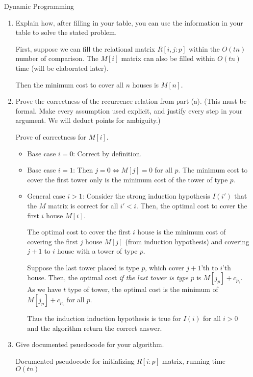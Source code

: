 \documentclass{article}
\numberwithin{table}{section}
\numberwithin{figure}{section}
\begin{document}
\begin{section}{Dynamic Programming}
\begin{enumerate}
    \item Explain how, after filling in your table, you can use the information in your table to solve the stated problem.
    \begin{tcolorbox}
        First, suppose we can fill the relational matrix $R[i, j : p]$ within the $O(tn)$ number of comparison. The $M[i]$ matrix can also be filled within $O(tn)$ time (will be elaborated later). 
        
        Then the minimum cost to cover all $n$ houses is $M[n]$.
    \end{tcolorbox}
    
    \item Prove the correctness of the recurrence relation from part (a). (This must be formal. Make every assumption used explicit, and justify every step in your argument. We will deduct points for ambiguity.)
    \begin{tcolorbox}
        Prove of correctness for $M[i]$.
        \begin{itemize}[noitemsep]
            \item Base case $i = 0$: Correct by definition. 
            \item Base case $i = 1$: Then $j = 0 \iff M[j] = 0$ for all $p$. The minimum cost to cover the first tower only is the minimum cost of the tower of type $p$. 
            \item General case $i > 1$: Consider the strong induction hypothesis $I(i')$ that the $M$ matrix is correct for all $i' < i$. Then, the optimal cost to cover the first $i$ house $M[i]$. 
            
            The optimal cost to cover the first $i$ house is the minimum cost of covering the first $j$ house $M[j]$ (from induction hypothesis) and covering $j+1$ to $i$ house with a tower of type $p$. 
            
            Suppose the last tower placed is type $p$, which cover $j+1$'th to $i$'th house. Then, the optimal cost \emph{if the last tower is type $p$} is $M[j_p] + c_{p_i}$. As we have $t$ type of tower, the optimal cost is the minimum of $M[j_p] + c_{p_i}$ for all $p$.
            
            Thus the induction induction hypothesis is true for $I(i)$ for all $i > 0$ and the algorithm return the correct answer.
        \end{itemize}
    \end{tcolorbox}
    
    \newpage
    \item Give documented psuedocode for your algorithm.
    \begin{tcolorbox}[breakable]
        Documented pseudocode for initializing $R[i : p]$ matrix, running time $O(tn)$
        

\end{tcolorbox}
\end{enumerate}
\end{section}
\end{document}
